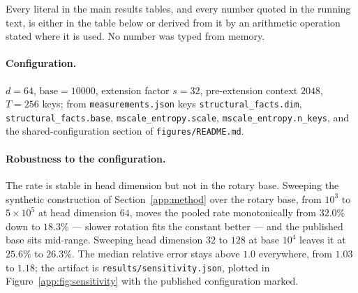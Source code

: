 \documentclass{article}
\theoremstyle{plain}
\theoremstyle{remark}
\begin{document}
Every literal in the main results tables, and every number quoted in the
running text, is either in the table below or derived from it by an arithmetic
operation stated where it is used. No number was typed from memory.

\paragraph{Configuration.} $d = 64$, $\mathrm{base} = 10000$, extension factor
$s = 32$, pre-extension context $2048$, $T = 256$ keys; from
\texttt{measurements.json} keys \texttt{structural\_facts.dim},
\texttt{structural\_facts.base}, \texttt{mscale\_entropy.scale},
\texttt{mscale\_entropy.n\_keys}, and the shared-configuration section of
\texttt{figures/README.md}.

\paragraph{Robustness to the configuration.} The rate is stable in head
dimension but not in the rotary base. Sweeping the synthetic construction of
Section~\ref{app:method} over the rotary base, from $10^{3}$ to $5\times10^{5}$
at head dimension $64$, moves the pooled rate monotonically from $32.0\%$ down
to $18.3\%$ --- slower rotation fits the constant better --- and the published
base sits mid-range. Sweeping head dimension $32$ to $128$ at base $10^{4}$
leaves it at $25.6\%$ to $26.3\%$. The
median relative error stays above $1.0$ everywhere, from $1.03$ to $1.18$; the
artifact is \texttt{results/sensitivity.json}, plotted in
Figure~\ref{app:fig:sensitivity} with the published configuration marked.
\end{document}
